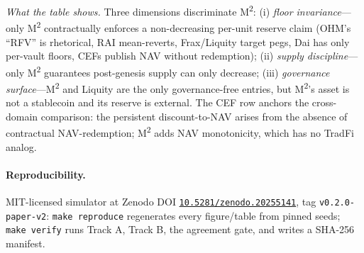 \emph{What the table shows.} Three dimensions discriminate M\textsuperscript{2}: (i) \emph{floor invariance}---only M\textsuperscript{2} contractually enforces a non-decreasing per-unit reserve claim (OHM's ``RFV'' is rhetorical, RAI mean-reverts, Frax/Liquity target pegs, Dai has only per-vault floors, CEFs publish NAV without redemption); (ii) \emph{supply discipline}---only M\textsuperscript{2} guarantees post-genesis supply can only decrease; (iii) \emph{governance surface}---M\textsuperscript{2} and Liquity are the only governance-free entries, but M\textsuperscript{2}'s asset is not a stablecoin and its reserve is external. The CEF row anchors the cross-domain comparison: the persistent discount-to-NAV \citep{LeeShleiferThaler1991,Pontiff1996} arises from the absence of contractual NAV-redemption; M\textsuperscript{2} adds NAV monotonicity, which has no TradFi analog.

\paragraph{Reproducibility.} MIT-licensed simulator at Zenodo DOI \href{https://doi.org/10.5281/zenodo.20255141}{\texttt{10.5281/zenodo.20255141}}, tag \texttt{v0.2.0-paper-v2}: \texttt{make reproduce} regenerates every figure/table from pinned seeds; \texttt{make verify} runs Track A, Track B, the agreement gate, and writes a SHA-256 manifest.
